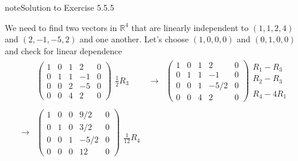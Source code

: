 \documentclass[letterpaper,10pt,english]{jupyterBook}
\begin{document}
\begin{sphinxadmonition}{note}{Solution to Exercise 5.5.5}



\sphinxAtStartPar
We need to find two vectors in \(\mathbb{R}^4\) that are linearly independent to \((1, 1, 2, 4)\) and \((2, -1, -5, 2)\) and one another. Let’s choose \((1, 0, 0, 0)\) and \((0, 1, 0, 0)\)  and check for linear dependence
\begin{equation*}
\begin{split} \begin{align*}
    & \left( \begin{array}{cccc|c}
        1 & 0 & 1 & 2 & 0 \\
        0 & 1 & 1 & -1 & 0 \\
        0 & 0 & 2 & -5 & 0 \\
        0 & 0 & 4 & 2 & 0
    \end{array} \right)
    \begin{matrix} \\ \\ \frac{1}{2}R_3 \\ \phantom{x} \end{matrix} &
    \longrightarrow &
    \left( \begin{array}{cccc|c}
        1 & 0 & 1 & 2 & 0 \\
        0 & 1 & 1 & -1 & 0 \\
        0 & 0 & 1 & -5/2 & 0 \\
        0 & 0 & 4 & 2 & 0
    \end{array} \right)
    \begin{matrix} R_1 - R_3 \\ R_2 - R_3 \\ \\ R_4 - 4R_1 \end{matrix} \\ \\
    \longrightarrow &
    \left( \begin{array}{cccc|c}
        1 & 0 & 0 & 9/2 & 0 \\
        0 & 1 & 0 & 3/2 & 0 \\
        0 & 0 & 1 & -5/2 & 0 \\
        0 & 0 & 0 & 12 & 0
    \end{array} \right)
    \begin{matrix} \\ \\ \\ \frac{1}{12}R_4 \end{matrix}  &

\end{align*}
\end{split}
\end{equation*}
\end{sphinxadmonition}
\end{document}
